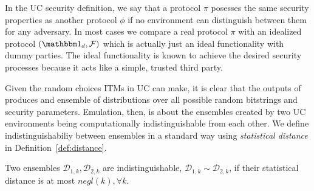 In the UC security definition, we say that a protocol $\pi$ posesses the same security properties as another protocol $\phi$ if no environment can distinguish between them for any adversary.
In most cases we compare a real protocol $\pi$ with an idealized protocol $(\idealP, \F)$ which is actually just an ideal functionality with dummy parties.
The ideal functionality is known to achieve the desired security processes because it acts like a simple, trusted third party.

Given the random choices ITMs in UC can make, it is clear that the outputs of  produces and ensemble of distributions over all possible random bitstrings and security parameters.
Emulation, then, is about the ensembles created by two UC environments being computationally indistinguishable from each other.
We define indistinguishabiliy between ensembles in a standard way using \textit{statistical distance} in Definition~\ref{def:distance}.

\begin{definition}[Indisinguishability]\label{def:distance}
Two ensembles $\mathcal{D}_{1,k}, \mathcal{D}_{2,k}$ are indistinguishable, $\mathcal{D}_{1,k} \sim \mathcal{D}_{2,k}$, if their statistical distance is at most $negl(k), \forall k$.
\end{definition}


